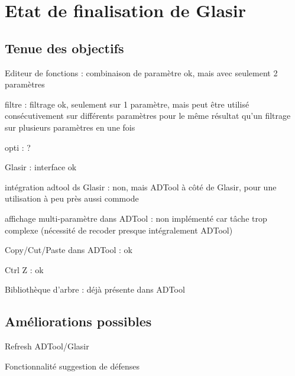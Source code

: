 \section{Etat de finalisation de Glasir}

\subsection{Tenue des objectifs}

Editeur de fonctions : 
combinaison de paramètre ok,   mais avec seulement 2 paramètres

filtre : 
filtrage ok, seulement sur 1 paramètre, mais peut être utilisé consécutivement sur différents paramètres pour le même résultat qu'un filtrage sur plusieurs paramètres en une fois  

opti : 
?

Glasir : 
interface ok

intégration adtool ds Glasir :
non, mais ADTool à côté de Glasir, pour une utilisation à peu près aussi commode

affichage multi-paramètre dans ADTool :
non implémenté car tâche trop complexe (nécessité de recoder presque intégralement ADTool)

Copy/Cut/Paste dans ADTool :
ok

Ctrl Z :
ok

Bibliothèque d'arbre : 
déjà présente dans ADTool

\subsection{Améliorations possibles}

Refresh ADTool/Glasir

Fonctionnalité suggestion de défenses